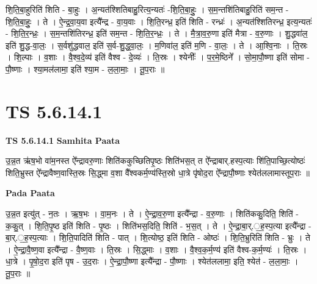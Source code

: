 \documentclass[17pt]{extarticle}
\begin{document}
शि॒ति॒बा॒हुरिति॑ शिति - बा॒हुः । अ॒न्यत॑श्शितिबाहु॒रित्य॒न्यतः॑ -शि॒ति॒बा॒हुः॒ । स॒म॒न्तशि॑तिबाहु॒रिति॑ सम॒न्त - शि॒ति॒बा॒हुः॒ । ते । ऐ॒न्द्र॒वा॒य॒वा इत्यै᳚न्द्र - वा॒य॒वाः । शि॒ति॒रन्ध्र॒ इति॑ शिति - रन्ध्रः॑ । अ॒न्यत॑श्शितिरन्ध्र॒ इत्य॒न्यतः॑ - शि॒ति॒र॒न्ध्रः॒ । स॒म॒न्तशि॑तिरन्ध्र॒ इति॑ सम॒न्त - शि॒ति॒र॒न्ध्रः॒ । ते । मै॒त्रा॒व॒रु॒णा इति॑ मैत्रा - व॒रु॒णाः । शु॒द्धवा॑ल॒ इति॑ शु॒द्ध-वा॒लः॒ । स॒र्वशु॑द्धवाल॒ इति॑ स॒र्व-शु॒द्ध॒वा॒लः॒ । म॒णिवा॑ल॒ इति॑ म॒णि - वा॒लः॒ । ते । आ॒श्वि॒नाः । ति॒स्रः । शि॒ल्पाः । व॒शाः । वै॒श्व॒दे॒व्य॑ इति॑ वैश्व - दे॒व्यः॑ । ति॒स्रः । श्येनीः᳚ । प॒र॒मे॒ष्ठिने᳚ । सो॒मा॒पौ॒ष्णा इति॑ सोमा - पौ॒ष्णाः । श्या॒मल॑लामा॒ इति॑ श्या॒म - ल॒ला॒माः॒ । तू॒प॒राः ॥  \newline





\section{ TS 5.6.14.1 }

\textbf{TS 5.6.14.1 } \newline
\textbf{Samhita Paata} \newline

उ॒न्न॒त ऋ॑ष॒भो वा॑म॒नस्त ऐ᳚न्द्रावरु॒णाः शिति॑ककुच्छितिपृ॒ष्ठः शिति॑भस॒त् त ऐ᳚न्द्राबार्.हस्प॒त्याः शि॑ति॒पाच्छि॒त्योष्ठः॑ शिति॒भ्रुस्त ऐ᳚न्द्रावैष्ण॒वास्ति॒स्रः सि॒द्ध्मा व॒शा वै᳚श्वकर्म॒ण्य॑स्ति॒स्रो धा॒त्रे पृ॑षोद॒रा ऐ᳚न्द्रापौ॒ष्णाः श्येत॑ललामास्तूप॒राः ॥ \newline

\textbf{Pada Paata} \newline

उ॒न्न॒त इत्यु॑त् - न॒तः । ऋ॒ष॒भः । वा॒म॒नः । ते । ऐ॒न्द्रा॒व॒रु॒णा इत्यै᳚न्द्रा - व॒रु॒णाः । शिति॑ककु॒दिति॒ शिति॑ - क॒कु॒त् । शि॒ति॒पृ॒ष्ठ इति॑ शिति - पृ॒ष्ठः । शिति॑भस॒दिति॒ शिति॑ - भ॒स॒त् । ते । ऐ॒न्द्रा॒बा॒र्.॒ह॒स्प॒त्या इत्यै᳚न्द्रा - बा॒र्.॒ह॒स्प॒त्याः । शि॒ति॒पादिति॑ शिति - पात् । शि॒त्योष्ठ॒ इति॑ शिति - ओष्ठः॑ । शि॒ति॒भ्रुरिति॑ शिति - भ्रुः । ते । ऐ॒न्द्रा॒वै॒ष्ण॒वा इत्यै᳚न्द्रा - वै॒ष्ण॒वाः । ति॒स्रः । सि॒द्ध्माः । व॒शाः । वै॒श्व॒क॒र्म॒ण्य॑ इति॑ वैश्व-क॒र्म॒ण्यः॑ । ति॒स्रः । धा॒त्रे । पृ॒षो॒द॒रा इति॑ पृष - उ॒द॒राः । ऐ॒न्द्रा॒पौ॒ष्णा इत्यै᳚न्द्रा - पौ॒ष्णाः । श्येत॑ललामा॒ इति॒ श्येत॑ - ल॒ला॒माः॒ । तू॒प॒राः ॥  \newline




\end{document}
